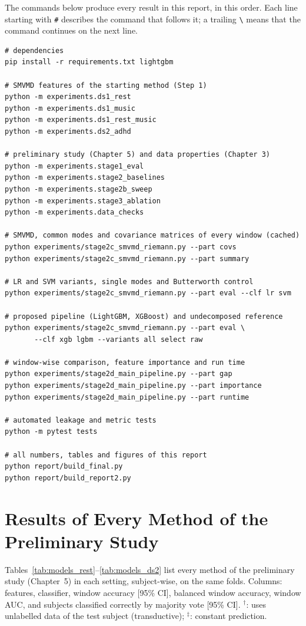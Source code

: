 The commands below produce every result in this report, in this order. Each line starting with
\texttt{\#} describes the command that follows it; a trailing \texttt{\textbackslash} means that
the command continues on the next line.

\begin{footnotesize}
\begin{verbatim}
# dependencies
pip install -r requirements.txt lightgbm

# SMVMD features of the starting method (Step 1)
python -m experiments.ds1_rest
python -m experiments.ds1_music
python -m experiments.ds1_rest_music
python -m experiments.ds2_adhd

# preliminary study (Chapter 5) and data properties (Chapter 3)
python -m experiments.stage1_eval
python -m experiments.stage2_baselines
python -m experiments.stage2b_sweep
python -m experiments.stage3_ablation
python -m experiments.data_checks

# SMVMD, common modes and covariance matrices of every window (cached)
python experiments/stage2c_smvmd_riemann.py --part covs
python experiments/stage2c_smvmd_riemann.py --part summary

# LR and SVM variants, single modes and Butterworth control
python experiments/stage2c_smvmd_riemann.py --part eval --clf lr svm

# proposed pipeline (LightGBM, XGBoost) and undecomposed reference
python experiments/stage2c_smvmd_riemann.py --part eval \
       --clf xgb lgbm --variants all select raw

# window-wise comparison, feature importance and run time
python experiments/stage2d_main_pipeline.py --part gap
python experiments/stage2d_main_pipeline.py --part importance
python experiments/stage2d_main_pipeline.py --part runtime

# automated leakage and metric tests
python -m pytest tests

# all numbers, tables and figures of this report
python report/build_final.py
python report/build_report2.py
\end{verbatim}
\end{footnotesize}

\chapter{Results of Every Method of the Preliminary Study}
\thispagestyle{empty}
Tables~\ref{tab:models_rest}--\ref{tab:models_ds2} list every method of the preliminary study
(Chapter~5) in each setting, subject-wise, on the same folds. Columns: features, classifier,
window accuracy [95\% CI], balanced window accuracy, window AUC, and subjects classified correctly
by majority vote [95\% CI]. $^\dagger$: uses unlabelled data of the test subject (transductive);
$^\ddagger$: constant prediction.

